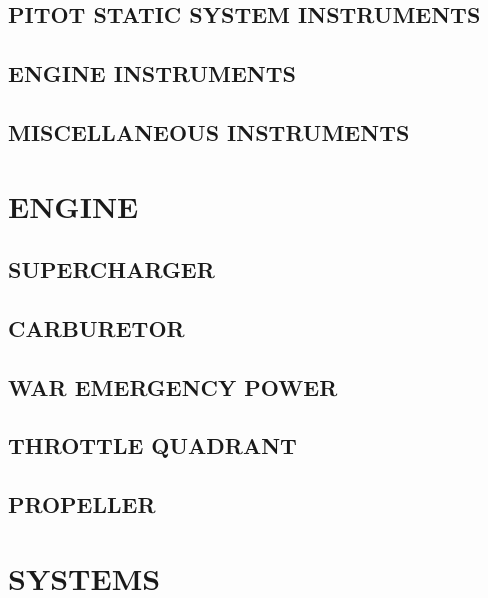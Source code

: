 \subsection{PITOT STATIC SYSTEM INSTRUMENTS}
\subsection{ENGINE INSTRUMENTS}
\subsection{MISCELLANEOUS INSTRUMENTS}


\section{ENGINE}
\subsection{SUPERCHARGER}
\subsection{CARBURETOR}
\subsection{WAR EMERGENCY POWER}
\subsection{THROTTLE QUADRANT}
\subsection{PROPELLER}


\section{SYSTEMS}
